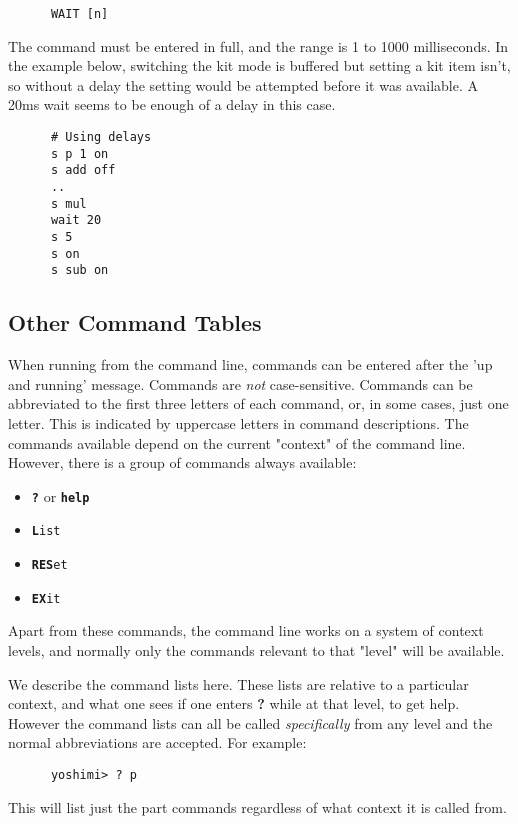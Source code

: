    \begin{verbatim}
      WAIT [n]
   \end{verbatim}

   The command must be entered in full, and the range is 1 to 1000
   milliseconds.
   In the example below, switching the kit mode is buffered but setting a kit
   item isn't, so without a delay the setting would be attempted before it
   was available. A 20ms wait seems to be enough of a delay in this case.
   \begin{verbatim}
      # Using delays
      s p 1 on
      s add off
      ..
      s mul
      wait 20
      s 5
      s on
      s sub on
   \end{verbatim}

\subsection{Other Command Tables}
\label{subsec:command_line_other_command_tables}

   When running from the command line, commands can be entered after the
   'up and running' message. Commands are \textsl{not} case-sensitive.
   Commands can be abbreviated to the first three letters of each command,
   or, in some cases, just one letter.  This is indicated by
   uppercase letters in command descriptions.
   The commands available depend on the current "context" of the command
   line. However, there is a group of commands always available:

   \begin{itemize}
      \item \texttt{\textbf{?}} or \texttt{\textbf{help}}
      \item \texttt{\textbf{L}ist}
      \item \texttt{\textbf{RES}et}
      \item \texttt{\textbf{EX}it}
   \end{itemize}

   Apart from these commands, the command line works on a system of
   context levels, and normally only the commands relevant to that "level"
   will be available.

   We describe the command lists here. These lists are relative to
   a particular context, and what one sees if one enters
   \textbf{?} while at that level, to get help.
   However the command lists can all be called \textsl{specifically} from any
   level and the normal abbreviations are accepted. For example:
   \begin{verbatim}
      yoshimi> ? p
   \end{verbatim}
   This will list just the part commands regardless of what context it is
   called from.

